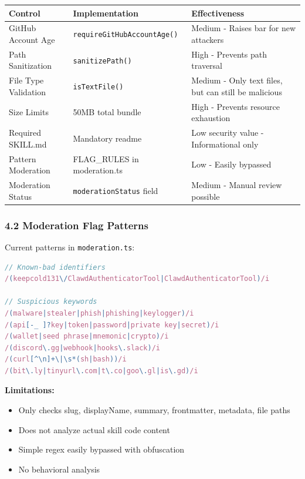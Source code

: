 \begin{table}[h]
\centering
\small
\begin{tabular}{|l|l|l|}
\hline
Control & Implementation & Effectiveness \\
\hline
GitHub Account Age & \texttt{requireGitHubAccountAge()} & Medium - Raises bar for new attackers \\
\hline
Path Sanitization & \texttt{sanitizePath()} & High - Prevents path traversal \\
\hline
File Type Validation & \texttt{isTextFile()} & Medium - Only text files, but can still be malicious \\
\hline
Size Limits & 50MB total bundle & High - Prevents resource exhaustion \\
\hline
Required SKILL.md & Mandatory readme & Low security value - Informational only \\
\hline
Pattern Moderation & FLAG\_RULES in moderation.ts & Low - Easily bypassed \\
\hline
Moderation Status & \texttt{moderationStatus} field & Medium - Manual review possible \\
\hline
\end{tabular}
\end{table}



\subsubsection{4.2 Moderation Flag Patterns}


Current patterns in \texttt{moderation.ts}:

\begin{lstlisting}[language=javascript]
// Known-bad identifiers
/(keepcold131\/ClawdAuthenticatorTool|ClawdAuthenticatorTool)/i

// Suspicious keywords
/(malware|stealer|phish|phishing|keylogger)/i
/(api[-_ ]?key|token|password|private key|secret)/i
/(wallet|seed phrase|mnemonic|crypto)/i
/(discord\.gg|webhook|hooks\.slack)/i
/(curl[^\n]+\|\s*(sh|bash))/i
/(bit\.ly|tinyurl\.com|t\.co|goo\.gl|is\.gd)/i
\end{lstlisting}


\textbf{Limitations:}

\begin{itemize}
  \item Only checks slug, displayName, summary, frontmatter, metadata, file paths
  \item Does not analyze actual skill code content
  \item Simple regex easily bypassed with obfuscation
  \item No behavioral analysis
\end{itemize}


